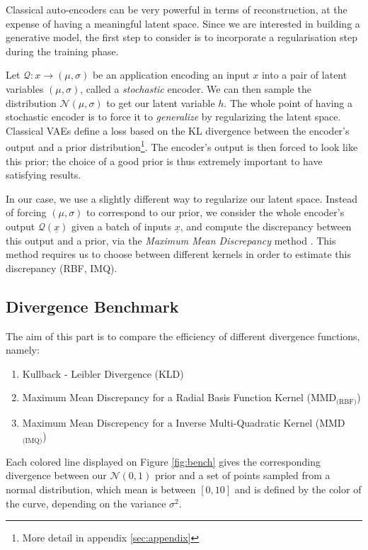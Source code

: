 \documentclass[11pt, english]{article}
\begin{document}
Classical auto-encoders can be very powerful in terms of reconstruction, at the expense of having a meaningful latent space. Since we are interested in building a generative model, the first step to consider is to incorporate a regularisation step during the training phase.\newline

Let $\mathcal Q: x \longrightarrow (\mu, \sigma)$ be an application encoding an input $x$ into a pair of latent variables $(\mu, \sigma)$, called a \textit{stochastic} encoder. We can then sample the distribution $\mathcal N(\mu, \sigma)$ to get our latent variable $h$. The whole point of having a stochastic encoder is to force it to \textit{generalize} by regularizing the latent space. Classical VAEs define a loss based on the KL divergence between the encoder's output and a prior distribution\footnote{\label{foot:appendix}More detail in appendix \ref{sec:appendix}}. The encoder's output is then forced to look like this prior; the choice of a good prior is thus extremely important to have satisfying results.\newline

In our case, we use a slightly different way to regularize our latent space. Instead of forcing $(\mu, \sigma)$ to correspond to our prior, we consider the whole encoder's output $\mathcal Q(\underline x)$ given a batch of inputs $\underline x$, and compute the discrepancy between this output and a prior, via the \textit{Maximum Mean Discrepancy} method . This method requires us to choose between different kernels in order to estimate this discrepancy (RBF, IMQ).

\subsection{Divergence Benchmark}
The aim of this part is to compare the efficiency of different divergence functions, namely:
\begin{enumerate}[noitemsep]
    \item Kullback - Leibler Divergence (KLD)
    \item Maximum Mean Discrepancy for a Radial Basis Function Kernel (MMD$_{\text{(RBF)}}$)
    \item Maximum Mean Discrepency for a Inverse Multi-Quadratic Kernel (MMD$_{\text{(IMQ)}}$)\newline
\end{enumerate}

\vspace{-0.5cm}
Each colored line displayed on Figure \ref{fig:bench} gives the corresponding divergence between our $\mathcal N(0,1)$ prior and a set of points sampled from a normal distribution, which mean is between $[0,10]$ and is defined by the color of the curve, depending on the variance $\sigma^2$.
\end{document}
